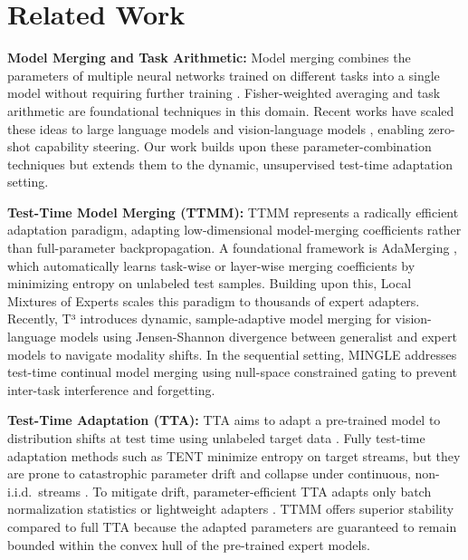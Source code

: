 \documentclass{article}
\theoremstyle{plain}
\theoremstyle{definition}
\theoremstyle{remark}
\begin{document}
\section{Related Work}
\label{sec:related}
\textbf{Model Merging and Task Arithmetic:} Model merging combines the parameters of multiple neural networks trained on different tasks into a single model without requiring further training \cite{wortsman22, yadav23, yadav24}. Fisher-weighted averaging \cite{matena22} and task arithmetic \cite{ilharco22} are foundational techniques in this domain. Recent works have scaled these ideas to large language models and vision-language models \cite{sung22, hu21}, enabling zero-shot capability steering. Our work builds upon these parameter-combination techniques but extends them to the dynamic, unsupervised test-time adaptation setting.

\textbf{Test-Time Model Merging (TTMM):} TTMM represents a radically efficient adaptation paradigm, adapting low-dimensional model-merging coefficients rather than full-parameter backpropagation. A foundational framework is AdaMerging \cite{yang24a}, which automatically learns task-wise or layer-wise merging coefficients by minimizing entropy on unlabeled test samples. Building upon this, Local Mixtures of Experts \cite{yang24b} scales this paradigm to thousands of expert adapters. Recently, T³ \cite{t3_2025} introduces dynamic, sample-adaptive model merging for vision-language models using Jensen-Shannon divergence between generalist and expert models to navigate modality shifts. In the sequential setting, MINGLE \cite{mingle24} addresses test-time continual model merging using null-space constrained gating to prevent inter-task interference and forgetting.

\textbf{Test-Time Adaptation (TTA):} TTA aims to adapt a pre-trained model to distribution shifts at test time using unlabeled target data \cite{sun20, wang21, schneider20, boudiaf22}. Fully test-time adaptation methods such as TENT \cite{wang21} minimize entropy on target streams, but they are prone to catastrophic parameter drift and collapse under continuous, non-i.i.d.\ streams \cite{wang22, zhao23}. To mitigate drift, parameter-efficient TTA adapts only batch normalization statistics \cite{schneider20} or lightweight adapters \cite{sung22, niu22}. TTMM \cite{yang24a, yang24b} offers superior stability compared to full TTA because the adapted parameters are guaranteed to remain bounded within the convex hull of the pre-trained expert models.
\end{document}
